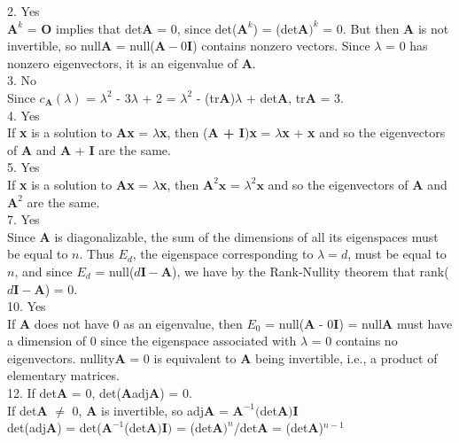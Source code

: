 \documentclass{article}
\begin{document}
    2. Yes\\
  $\textbf{A}^k$ = \textbf{O} implies that det\textbf{A} = 0, since det($\textbf{A}^k$) = (det$\textbf{A})^k$ = 0. But then \textbf{A} is not invertible, so null\textbf{A} = null($\textbf{A} - 0\textbf{I}$) contains nonzero vectors. Since $\lambda$ = 0 has nonzero eigenvectors, it is an eigenvalue of \textbf{A}.\\

    3. No\\
    Since $c_{\textbf{A}}(\lambda)$ = $\lambda^{2}$ - 3$\lambda$ + 2 = $\lambda^{2}$ - (tr$\textbf{A}$)$\lambda$ + det$\textbf{A}$, tr\textbf{A} = 3.\\

    4. Yes\\
    If \textbf{x} is a solution to \textbf{Ax} = $\lambda$\textbf{x}, then (\textbf{A + I})\textbf{x} = $\lambda$\textbf{x} + \textbf{x} and so the eigenvectors of \textbf{A} and \textbf{A} + \textbf{I} are the same.\\

    5. Yes\\
    If \textbf{x} is a solution to \textbf{Ax} = $\lambda$\textbf{x}, then $\textbf{A}^2\textbf{x}$ = $\lambda^2\textbf{x}$ and so the eigenvectors of \textbf{A} and $\textbf{A}^2$ are the same.\\

    7. Yes\\
    Since \textbf{A} is diagonalizable, the sum of the dimensions of all its eigenspaces must be equal to $n$. Thus $\textit{E}_d$, the eigenspace corresponding to $\lambda = d$, must be equal to $n$, and since $\textit{E}_d$ = null($d\textbf{I} - \textbf{A}$), we have by the Rank-Nullity theorem that rank($d\textbf{I} - \textbf{A}$) = 0.\\

    10. Yes\\
    If \textbf{A} does not have 0 as an eigenvalue, then $\textit{E}_0$ = null(\textbf{A} - 0\textbf{I}) = null\textbf{A} must have a dimension of 0 since the eigenspace associated with $\lambda$ = 0 contains no eigenvectors. nullity\textbf{A} = 0 is equivalent to \textbf{A} being invertible, i.e., a product of elementary matrices. \\

    12. If det\textbf{A} = 0, det(\textbf{A}adj\textbf{A}) = 0.\\
    If det\textbf{A} $\neq$ 0, \textbf{A} is invertible, so adj\textbf{A} = $\textbf{A}^{-1}($det$\textbf{A})\textbf{I}$\\
    det(adj\textbf{A}) = det($\textbf{A}^{-1}$(det$\textbf{A})\textbf{I})$ = (det$\textbf{A})^n$/det\textbf{A} = (det\textbf{A})$^{n-1}$\\
\end{document}
